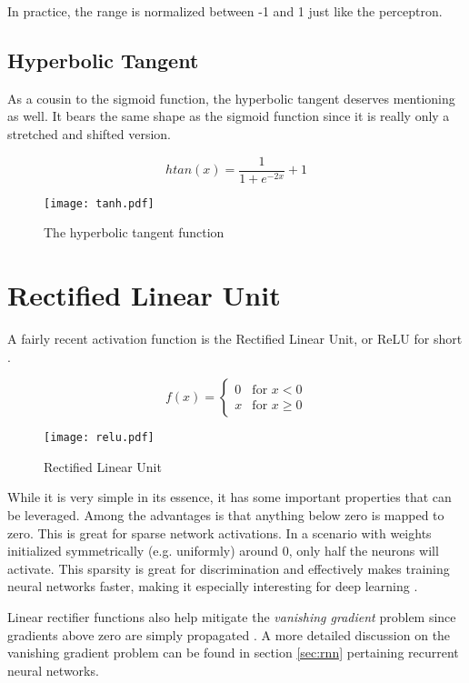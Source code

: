 In practice, the range is normalized between -1 and 1
just like the perceptron.

\subsection{Hyperbolic Tangent}
As a cousin to the sigmoid function, the hyperbolic tangent
deserves mentioning as well.
It bears the same shape as the sigmoid function
since it is really only a stretched
and shifted version.

\begin{equation}
\label{eq.ml.tanh}
htan(x) = \frac{1}{1 + e^{-2x}}+1
\end{equation}

\begin{figure}[h]
\center
\texttt{[image: tanh.pdf]}
\caption{The hyperbolic tangent function}
\label{fig.ml.htan}
\end{figure}

\section{Rectified Linear Unit}
\label{sec:relu}
A fairly recent activation function is the
Rectified Linear Unit, or ReLU for short
\parencite{Nair2010}.

\begin{equation}
\label{eq.relu}
f(x) =
\begin{cases}
0 & \text{for } x < 0 \\
x & \text{for } x \geq 0
\end{cases}
\end{equation}

\begin{figure}[h]
\center
\texttt{[image: relu.pdf]}
\caption{Rectified Linear Unit}
\label{fig.ml.relu}
\end{figure}

While it is very simple in its essence,
it has some important properties
that can be leveraged.
Among the advantages is that anything
below zero is mapped to zero.
This is great for sparse
network activations.
In a scenario with weights initialized
symmetrically (e.g. uniformly) around 0,
only half the neurons will activate.
This sparsity is great for discrimination
and effectively makes training
neural networks faster,
making it especially interesting for
deep learning
\parencite{Y.2015a}.

Linear rectifier functions also help mitigate
the \textit{vanishing gradient} problem
since gradients above zero
are simply propagated
\parencite{Glorot2011}.
A more detailed discussion on the vanishing gradient problem
can be found in section \ref{sec:rnn}
pertaining recurrent neural networks.

